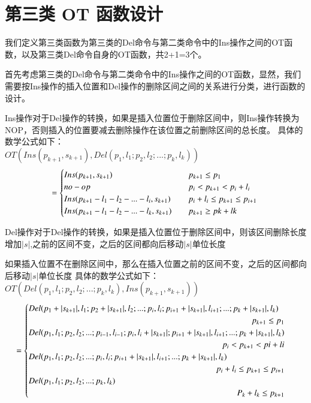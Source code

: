 \section{第三类 OT 函数设计}
\par 我们定义第三类函数为第三类的Del命令与第二类命令中的Ins操作之间的OT函数，以及第三类Del命令自身的OT函数，共2+1=3个。

\par 首先考虑第三类的Del命令与第二类命令中的Ins操作之间的OT函数，显然，我们需要按Ins操作的插入位置和Del操作的删除区间之间的关系进行分类，进行函数的设计。
\par Ins操作对于Del操作的转换，如果是插入位置位于删除区间中，则Ins操作转换为NOP，否则插入的位置要减去删除操作在该位置之前删除区间的总长度。
具体的数学公式如下：\\
$OT(Ins(p_{k+1},s_{k+1}),Del(p_1,l_1;p_2,l_2;...;p_k,l_k))$\\
\begin{equation}
= \begin{cases}
Ins(p_{k+1},s_{k+1}) \quad & p_{k+1} \le p_1 \\
no-op \quad & p_i<p_{k+1}<p_i+l_i\\
Ins(p_{k+1}-l_1-l_2-...-l_i,s_{k+1}) \quad & p_i+l_i \le p_{k+1} \le p_{i+1}\\
Ins(p_{k+1}-l_1-l_2-...-l_k,s_{k+1}) \quad & p_{k+1} \ge pk+lk \end{cases}\\
\end{equation}

\par Del操作对于Del操作的转换，如果是插入位置位于删除区间中，则该区间删除长度增加$|s|$,之前的区间不变，之后的区间都向后移动$|s|$单位长度
\par 如果插入位置不在删除区间中，那么在插入位置之前的区间不变，之后的区间都向后移动$|s|$单位长度
具体的数学公式如下：\\
$OT(Del(p_1,l_1;p_2,l_2;...;p_k,l_k),Ins(p_{k+1},s_{k+1}))$\\
\begin{equation}
= \begin{cases}
Del(p_1+|s_{k+1}|,l_1;p_2+|s_{k+1}|,l_2;...;p_i,l_i;p_{i+1}+|s_{k+1}|,l_{i+1};...;p_k+|s_{k+1}|,l_k)\\
  \quad \hfill p_{k+1} \le p_1 \\
Del(p_1,l_1;p_2,l_2;...;p_{i-1},l_{i-1};p_i,l_i+|s_{k+1}|;p_{i+1}+|s_{k+1}|,l_{i+1};...;p_k+|s_{k+1}|,l_k)\\
 \quad \hfill p_i<p_{k+1} < pi+li \\
Del(p_1,l_1;p_2,l_2;...;p_i,l_i;p_{i+1}+|s_{k+1}|,l_{i+1};...;p_k+|s_{k+1}|,l_k)\\
  \quad \hfill p_i+l_i \le p_{k+1} \le p_{i+1}\\
Del(p_1,l_1;p_2,l_2;...;p_k,l_k) \\
 \quad \hfill P_k+l_k \le p_{k+1} \\
 \end{cases}\\
\end{equation}

